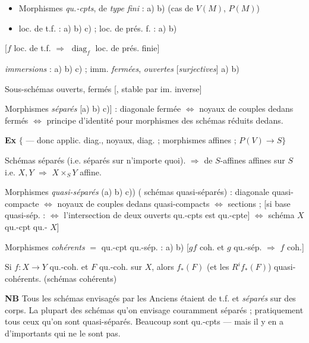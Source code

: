 \documentclass[11pt,a4paper]{article}
\begin{document}
\begin{itemize}
  \item[global] Morphismes \emph{qu.-cpts}, de \emph{type fini} : a) b) (cas de $V(M)$, $P(M)$)
  \item[local] loc. de t.f. : a) b) c) ; loc. de prés. f. : a) b) 
\end{itemize}

[$f$ \struck{\ill{}} loc. de t.f. $\Rightarrow$ $\operatorname{diag}_f$ loc. de prés. finie]

\emph{immersions} : a) b) c) ; imm. \emph{fermées}, \emph{ouvertes} [\emph{surjectives}] a) b)

Sous-schémas ouverts, fermés [, stable par im. inverse]

Morphismes \emph{séparés} [a) b) c)] : diagonale fermée $\Longleftrightarrow$ noyaux de couples dedans fermés $\Longleftrightarrow$ principe d'identité pour morphismes des schémas réduits dedans.

\textbf{Ex} $\{$ --- donc applic. diag., noyaux, diag. ; morphismes affines ; $P(V) \to S\}$

\struck{\ill{}}

Schémas séparés (i.e. séparés sur n'importe quoi). $\Rightarrow$  \struck{\ill{}} de $S$-affines \ill{} affines sur $S$ i.e. $X, Y$ \ill{} $\Rightarrow$ $X \times_S Y$ affine.

Morphismes \emph{quasi-séparés} (a) b) c)) (\struck{\ill{}} schémas quasi-séparés) : diagonale quasi-compacte $\Longleftrightarrow$ noyaux de couples dedans quasi-compacts $\Longleftrightarrow$ sections  ; [si base quasi-sép. : $\Longleftrightarrow$ \struck{\ill{}} l'intersection de deux ouverts qu.-cpts est qu.-cpte] $\Longleftrightarrow$  schéma \ill{} $X$ qu.-cpt \ill{} qu.- \ill{} $X$]


Morphismes \emph{cohérents} $=$ qu.-cpt qu.-sép. : a) b) [$gf$ coh. et $g$ qu.-sép. $\Rightarrow$ $f$ coh.]

Si $f : X \to Y$ qu.-coh. et $F$ qu.-coh. sur $X$, alors $f_*(F)$ (et les $R^i f_*(F)$) quasi-cohérents. \quad (schémas cohérents)

\textbf{NB} Tous les schémas envisagés par les Anciens étaient de t.f. et \emph{séparés} sur des corps. La plupart des schémas qu'on envisage couramment  séparés ; pratiquement tous ceux qu'on  sont quasi-séparés. Beaucoup sont qu.-cpts --- mais il y en a d'importants qui ne le sont pas.
\end{document}
